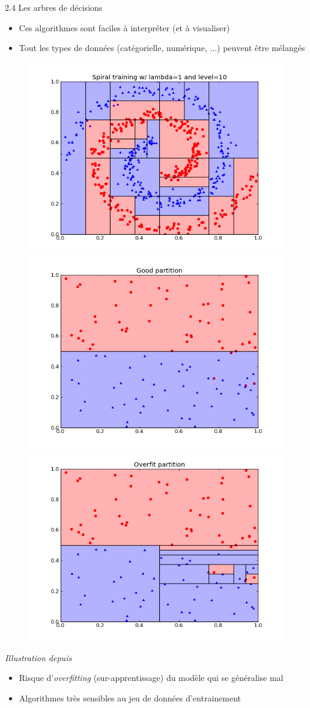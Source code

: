 \begin{frame}{2.4 Les arbres de décisions}
  \begin{itemize}
  \item Ces algorithmes sont faciles à interpréter (et à visualiser)
  \item Tout les types de données (catégorielle, numérique, ...) peuvent être mélangés
  \end{itemize}
  \begin{figure}
    \includegraphics[trim={0 0 0 40},clip,width=.3\textwidth]{fig/spiralDTresult.png}
    \includegraphics[trim={0 0 0 40},clip,width=.3\textwidth]{fig/goodPartitionDT.png}
    \includegraphics[trim={0 0 0 40},clip,width=.3\textwidth]{fig/overfittingPartitionDT.png}
  \end{figure}
  \vspace{-1cm}
  \begin{center}
    \scriptsize
    \textit{Illustration depuis \href{https://www.classes.cs.uchicago.edu/archive/2013/winter/12200-1/assignments/pa4/index.html}{\color{blue}{University of Chicago}}}
  \end{center}
  \begin{itemize}
  \item Risque d'\textit{overfitting} (sur-apprentissage) du modèle qui se généralise mal
  \item Algorithmes très sensibles au jeu de données d'entrainement
  \end{itemize}
\end{frame}

